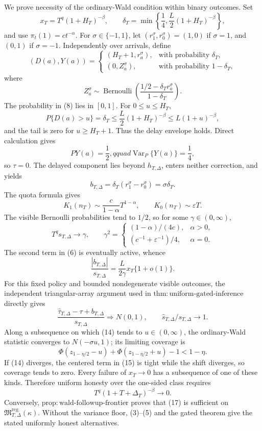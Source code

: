 We prove necessity of the ordinary-Wald condition within binary outcomes.  Set
\[
 x_T=T^q(1+H_T)^{-\beta},\qquad
 \delta_T=\min\left\{\frac14,\frac L2(1+H_T)^{-\beta}\right\}, \tag{6}
\]
and use \(\pi_t(1)=ct^{-\alpha}\).  For \(\sigma\in\{-1,1\}\), let \((r_1^\sigma,r_0^\sigma)=(1,0)\) if \(\sigma=1\), and \((0,1)\) if \(\sigma=-1\).  Independently over arrivals, define
\[
 (D(a),Y(a))=
 \begin{cases}
 (H_T+1,r_a^\sigma),&\text{with probability }\delta_T,\\
 (0,Z_a^\sigma),&\text{with probability }1-\delta_T,
 \end{cases} \tag{7}
\]
where
\[
 Z_a^\sigma\sim\operatorname{Bernoulli}\!\left(
 \frac{1/2-\delta_Tr_a^\sigma}{1-\delta_T}\right). \tag{8}
\]
The probability in (8) lies in \([0,1]\).  For \(0\leq u\leq H_T\),
\[
 P\{D(a)>u\}=\delta_T\leq\frac L2(1+H_T)^{-\beta}
 \leq L(1+u)^{-\beta}, \tag{9}
\]
and the tail is zero for \(u\geq H_T+1\).  Thus the delay envelope holds.  Direct calculation gives
\[
 PY(a)=\frac12,qquad \operatorname{Var}_P\{Y(a)\}=\frac14, \tag{10}
\]
so \(\tau=0\).  The delayed component lies beyond \(h_{T,\Delta}\), enters neither correction, and yields
\[
 b_{T,\Delta}=\delta_T(r_1^\sigma-r_0^\sigma)=\sigma\delta_T. \tag{11}
\]
The quota formula gives
\[
 K_1(n_T)\sim\frac{c}{1-\alpha}T^{1-\alpha},
 \qquad K_0(n_T)\sim\varepsilon T. \tag{12}
\]
The visible Bernoulli probabilities tend to \(1/2\), so for some \(\gamma\in(0,\infty)\),
\[
 T^q s_{T,\Delta}\longrightarrow\gamma,
 \qquad
 \gamma^2=
 \begin{cases}
 (1-\alpha)/(4c),&\alpha>0,\\
 (c^{-1}+\varepsilon^{-1})/4,&\alpha=0.
 \end{cases} \tag{13}
\]
The second term in (6) is eventually active, whence
\[
 \frac{|b_{T,\Delta}|}{s_{T,\Delta}}
 =\frac{L}{2\gamma}x_T\{1+o(1)\}. \tag{14}
\]
For this fixed policy and bounded nondegenerate visible outcomes, the independent triangular-array argument used in \(\mathrm{thm:uniform\text{-}gated\text{-}inference}\) directly gives
\[
 \frac{\widehat\tau_{T,\Delta}-\tau+b_{T,\Delta}}
 {\widehat s_{T,\Delta}}\Rightarrow N(0,1),
 \qquad \widehat s_{T,\Delta}/s_{T,\Delta}\to1. \tag{15}
\]
Along a subsequence on which (14) tends to \(u\in(0,\infty)\), the ordinary-Wald statistic converges to \(N(-\sigma u,1)\); its limiting coverage is
\[
 \Phi(z_{1-\eta/2}-u)+\Phi(z_{1-\eta/2}+u)-1<1-\eta. \tag{16}
\]
If (14) diverges, the centered term in (15) is tight while the shift diverges, so coverage tends to zero.  Every failure of \(x_T\to0\) has a subsequence of one of these kinds.  Therefore uniform honesty over the one-sided class requires
\[
 T^q(1+T+\Delta_T)^{-\beta}\longrightarrow0. \tag{17}
\]
Conversely, \(\mathrm{prop:wald\text{-}followup\text{-}frontier}\) proves that (17) is sufficient on \(\mathfrak M_{T,\Delta}^{\mathrm{reg}}(\kappa)\).  Without the variance floor, (3)--(5) and the gated theorem give the stated uniformly honest alternatives.


